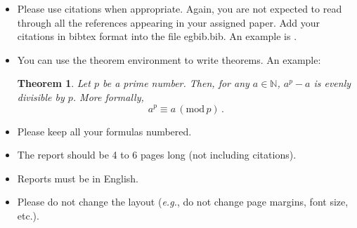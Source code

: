 \documentclass[a4paper,10pt]{article}
\newtheorem{theorem}{Theorem}
\begin{document}
\begin{itemize}
\item Please use citations when appropriate. Again, you are not expected to read through all the references appearing in your assigned paper. Add your citations in bibtex format into the file egbib.bib. An example is \cite{neyshabur2017exploring}.
\item You can use the theorem environment to write theorems. An example:
\begin{theorem}
\label{mytheorem}
Let $p$ be a prime number. Then, for any $a \in \mathbb{N}$, $a^p - a$ is evenly divisible by $p$. More formally,
\begin{equation}
a^p \equiv a \, (\mathrm{mod}\, p)\,.
\end{equation}
\end{theorem}
\item Please keep all your formulas numbered.
\item The report should be 4 to 6 pages long (not including citations).
\item Reports must be in English.
\item Please do not change the layout ({\em e.g.}, do not change page margins, font size, etc.).
\end{itemize}

\nocite{*}



\end{document}
